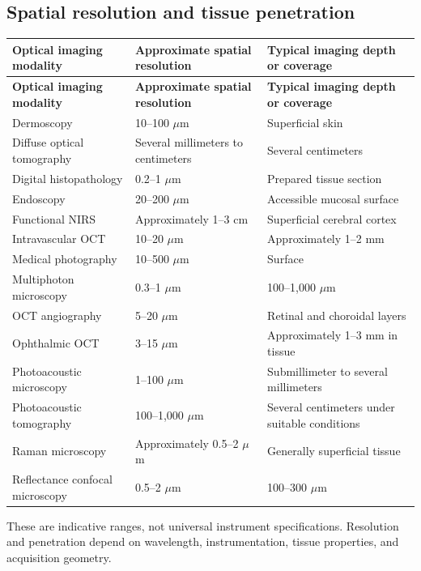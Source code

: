 \subsection{Spatial resolution and tissue penetration}
\begin{longtable}{@{}p{}p{}p{}@{}}
\toprule
\textbf{Optical imaging modality} & \textbf{Approximate spatial resolution} & \textbf{Typical imaging depth or coverage} \\
\midrule
\endfirsthead
\toprule
\textbf{Optical imaging modality} & \textbf{Approximate spatial resolution} & \textbf{Typical imaging depth or coverage} \\
\midrule
\endhead
Dermoscopy & 10--100 $\mu$m & Superficial skin \\
Diffuse optical tomography & Several millimeters to centimeters & Several centimeters \\
Digital histopathology & 0.2--1 $\mu$m & Prepared tissue section \\
Endoscopy & 20--200 $\mu$m & Accessible mucosal surface \\
Functional NIRS & Approximately 1--3 cm & Superficial cerebral cortex \\
Intravascular OCT & 10--20 $\mu$m & Approximately 1--2 mm \\
Medical photography & 10--500 $\mu$m & Surface \\
Multiphoton microscopy & 0.3--1 $\mu$m & 100--1,000 $\mu$m \\
OCT angiography & 5--20 $\mu$m & Retinal and choroidal layers \\
Ophthalmic OCT & 3--15 $\mu$m & Approximately 1--3 mm in tissue \\
Photoacoustic microscopy & 1--100 $\mu$m & Submillimeter to several millimeters \\
Photoacoustic tomography & 100--1,000 $\mu$m & Several centimeters under suitable conditions \\
Raman microscopy & Approximately 0.5--2 $\mu$m & Generally superficial tissue \\
Reflectance confocal microscopy & 0.5--2 $\mu$m & 100--300 $\mu$m \\
\bottomrule
\end{longtable}
These are indicative ranges, not universal instrument specifications. Resolution and penetration depend on wavelength, instrumentation, tissue properties, and acquisition geometry.


